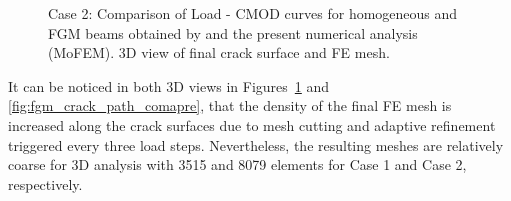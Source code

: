 \documentclass[onecolumn]{svjour3}
\begin{document}
% 
\begin{figure}
	\centering
	\caption{Case 2: Comparison of Load - CMOD curves for homogeneous and FGM beams obtained by \citep{kim2004simulation} and the present numerical analysis (MoFEM). 3D view of final crack surface and FE mesh.}
	\label{fig:fgm_case2}
\end{figure}

It can be noticed in both 3D views in Figures~\ref{fig:fgm_case2} and \ref{fig:fgm_crack_path_comapre}, that the density of the final FE mesh is increased along the crack surfaces due to mesh cutting and adaptive refinement triggered every three load steps. Nevertheless, the resulting meshes are relatively coarse for 3D analysis with 3515 and 8079 elements for Case 1 and Case 2, respectively.
% 
\end{document}
